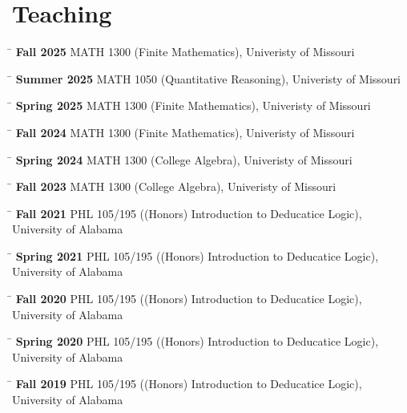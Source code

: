 \documentclass[10pt]{article}
\newcommand{\teaching}[4]{
    \begin{tabbing}
        \hspace{2.5cm} \= \kill
        \textbf{#1} \> #2 (#3), #4
    \end{tabbing}
}
\begin{document}

\section{Teaching}

\teaching{Fall 2025}{MATH 1300}{Finite Mathematics}{Univeristy of Missouri}
\teaching{Summer 2025}{MATH 1050}{Quantitative Reasoning}{Univeristy of Missouri}
\teaching{Spring 2025}{MATH 1300}{Finite Mathematics}{Univeristy of Missouri}
\teaching{Fall 2024}{MATH 1300}{Finite Mathematics}{Univeristy of Missouri}
\teaching{Spring 2024}{MATH 1300}{College Algebra}{Univeristy of Missouri}
\teaching{Fall 2023}{MATH 1300}{College Algebra}{Univeristy of Missouri}
\teaching{Fall 2021}{PHL 105/195}{(Honors) Introduction to Deducatice Logic}{University of Alabama}
\teaching{Spring 2021}{PHL 105/195}{(Honors) Introduction to Deducatice Logic}{University of Alabama}
\teaching{Fall 2020}{PHL 105/195}{(Honors) Introduction to Deducatice Logic}{University of Alabama}
\teaching{Spring 2020}{PHL 105/195}{(Honors) Introduction to Deducatice Logic}{University of Alabama}
\teaching{Fall 2019}{PHL 105/195}{(Honors) Introduction to Deducatice Logic}{University of Alabama}
\end{document}
